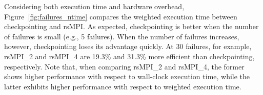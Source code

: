 
Considering both execution time and hardware overhead, Figure~\ref{fig:failures_ntime} compares the weighted execution time between checkpointing and rsMPI.  As expected, checkpointing is better when the number of  failures is small (e.g., 5 failures).  When the number of failures increases,  however, checkpointing loses its advantage quickly. At 30 failures, for example, rsMPI\_2 and rsMPI\_4 are 19.3\% and 31.3\% more efficient than  checkpointing, respectively.
Note that, when comparing rsMPI\_2 and rsMPI\_4, the former shows higher performance with respect to wall-clock execution time, while the latter exhibits higher performance with respect to weighted execution time. 

